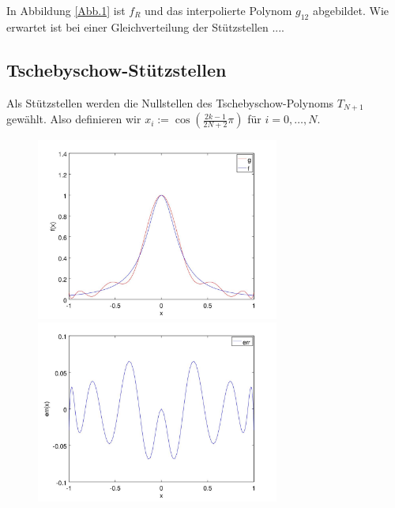 \documentclass[]{scrartcl}
\begin{document}
	In Abbildung \ref{Abb.1} ist $f_R$ und das interpolierte Polynom $g_{12}$ abgebildet. Wie erwartet ist bei einer Gleichverteilung der Stützstellen ....
	\subsection{Tschebyschow-Stützstellen}
	Als Stützstellen werden die Nullstellen des Tschebyschow-Polynoms $T_{N+1}$ gewählt. Also definieren wir $x_i:=\cos(\frac{2k-1}{2N+2}\pi)$ für $i=0,\dots,N$.
	
	\begin{figure}[h]
		\centering
		\begin{minipage}{0.5\textwidth}
			\includegraphics[width=8cm,keepaspectratio]{runge_tscheb}
			\caption{\label{Abb.3}}
		\end{minipage}
		\begin{minipage}{0.49\textwidth}
			\includegraphics[width=8cm,keepaspectratio]{runge_tscheb_err}
			\caption{\label{Abb.4}}
		\end{minipage}
	\end{figure}
	
\end{document}
